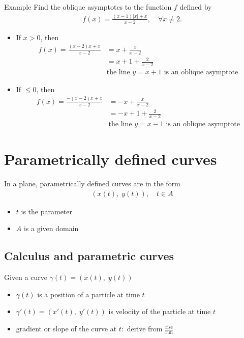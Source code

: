 \documentclass{report}
\begin{document}
			\begin{question}{Example}
				Find the oblique asymptotes to the function $f$ defined by
					\begin{align*}
						f(x) = \frac{(x-1)|x| + x}{x - 2}, \quad \forall x \neq 2.
					\end{align*}

					\begin{itemize}
						\item If $x > 0$, then
							\begin{align*}
								f(x) = \frac{(x-2)x + x}{x-2} &= x + \frac{x}{x-2}	\\
															  &= x + 1 + \frac{2}{x-2}	\\
															  & \text{the line } y = x+1 \text{ is an oblique asymptote}
							\end{align*}
						\item If $\leq 0$, then
							\begin{align*}
								f(x) = \frac{-(x-2)x+x}{x-2} &= -x + \frac{x}{x-2}	\\
															 &= -x + 1 + \frac{2}{x-2}	\\
															 & \text{the line } y = x-1 \text{ is an oblique asymptote}
							\end{align*}
					\end{itemize}
			\end{question}

	\section{Parametrically defined curves}

		In a plane, parametrically defined curves are in the form
			\begin{align*}
				(x(t), \; y(t)), \quad t \in A
			\end{align*}
			\begin{itemize}
				\item $t$ is the parameter
				\item $A$ is a given domain
			\end{itemize}

		\subsection{Calculus and parametric curves}
			
			Given a curve $\gamma(t) = (x(t), \;y(t))$
			\begin{itemize}
				\item $\gamma(t)$ is a position of a particle at time $t$
				\item $\gamma'(t) = (x'(t),\;y'(t))$ is velocity of the particle at time $t$
				\item gradient or slope of the curve at $t:$ derive from $\frac{\text{rise}}{\text{run}}$
			\end{itemize}
\end{document}
